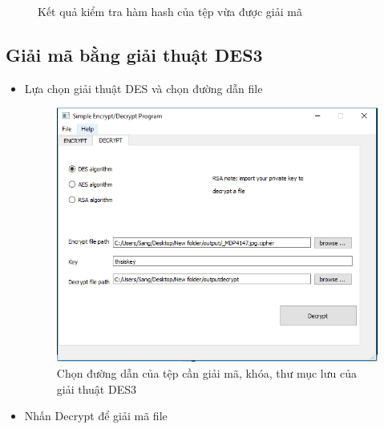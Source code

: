 \documentclass[a4paper]{article}
\begin{document}
\begin{itemize}
\begin{center}
\begin{figure}[H]
\begin{center}
    \end{center}
    \caption{Kết quả kiểm tra hàm hash của tệp vừa được giải mã}
    \label{refhinh9}
    \end{figure}
\end{center}
	\end{itemize}

\subsection{Giải mã bằng giải thuật DES3} 
\begin{itemize}
\item
Lựa chọn giải thuật DES và chọn đường dẫn file
\begin{center}
    \begin{figure}[H]
    \begin{center}
     \includegraphics[scale=.5]{hinh/decrypt-des-1}
    \end{center}
    \caption{Chọn đường dẫn của tệp cần giải mã, khóa, thư mục lưu của giải thuật DES3}
    \label{refhinh10}
    \end{figure}
\end{center}
\item
Nhấn Decrypt để giải mã file
\begin{center}
    \begin{figure}[H]
    \begin{center}

\end{center}
\end{figure}
\end{center}
\end{itemize}
\end{document}
